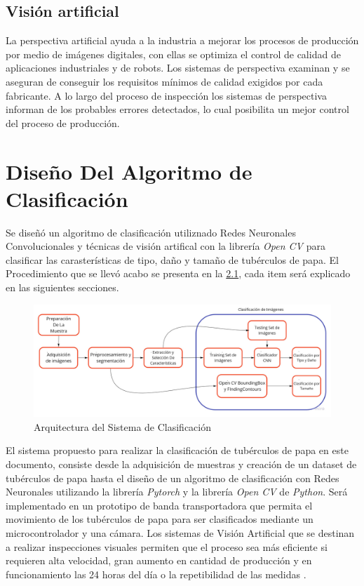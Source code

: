 	\section{Visión artificial} La perspectiva artificial ayuda a la industria a mejorar los procesos de producción por medio de imágenes digitales, con ellas se optimiza el control de calidad de aplicaciones industriales y de robots. Los sistemas de perspectiva examinan y se aseguran de conseguir los requisitos mínimos de calidad exigidos por cada fabricante. A lo largo del proceso de inspección los sistemas de perspectiva informan de los probables errores detectados, lo cual posibilita un mejor control del proceso de producción.


\chapter{Diseño Del Algoritmo de Clasificación}


Se diseñó un algoritmo de clasificación utiliznado Redes Neuronales Convolucionales y técnicas de visión artifical con la librería \textit{Open CV} para clasificar las carasterísticas de tipo, daño y tamaño de tubérculos de papa. El Procedimiento que se llevó acabo se presenta en la \ref{fig:flujogeneral}, cada item será explicado en las siguientes secciones. 


\begin{figure}[ht]
	\centering
	\includegraphics[scale=0.3]{Figs/FGGeneral.jpg}
	\caption{Arquitectura del Sistema de Clasificación}
	\label{fig:flujogeneral}
\end{figure}

El sistema propuesto para realizar la clasificación de tubérculos de papa en este documento, consiste desde la adquisición de muestras y creación de un dataset de tubérculos de papa hasta el diseño de un algoritmo de clasificación con Redes Neuronales utilizando la librería \textit{Pytorch} y la librería \textit{Open CV} de \textit{Python}. Será implementado en un prototipo de banda transportadora que permita el movimiento de los tubérculos de papa para ser clasificados mediante un microcontrolador y una cámara. Los sistemas de Visión Artificial que se destinan a realizar inspecciones visuales permiten que el proceso sea más eficiente si requieren alta velocidad, gran aumento en cantidad de producción y en funcionamiento las 24 horas del día o la repetibilidad de las medidas \cite{artificial2012aplicacion}.


